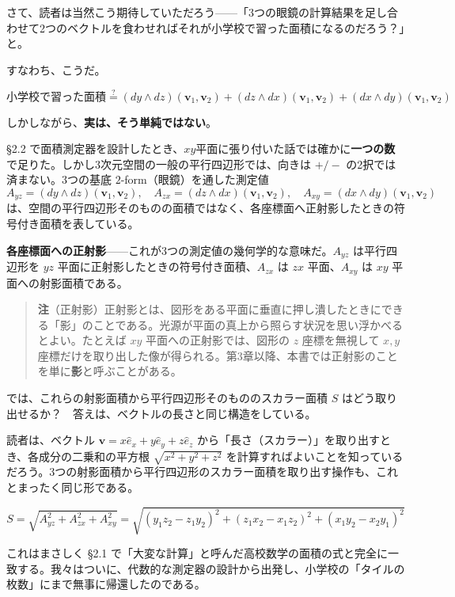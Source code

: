 \documentclass[a4paper,12pt,openany]{book}
\begin{document}
さて、読者は当然こう期待していただろう——「3つの眼鏡の計算結果を足し合わせて2つのベクトルを食わせればそれが小学校で習った面積になるのだろう？」と。

すなわち、こうだ。

\[
\text{小学校で習った面積} \stackrel{?}{=} (dy \wedge dz)(\mathbf{v}_1, \mathbf{v}_2) + (dz \wedge dx)(\mathbf{v}_1, \mathbf{v}_2) + (dx \wedge dy)(\mathbf{v}_1, \mathbf{v}_2)
\]

しかしながら、\textbf{実は、そう単純ではない}。

§2.2
で面積測定器を設計したとき、\(xy\)平面に張り付いた話では確かに\textbf{一つの数}で足りた。しかし3次元空間の一般の平行四辺形では、向きは
\(+/-\) の2択では済まない。3つの基底 \(2\)-form（眼鏡）を通した測定値
\[A_{yz} = (dy \wedge dz)(\mathbf{v}_1,\mathbf{v}_2),\quad A_{zx} = (dz \wedge dx)(\mathbf{v}_1,\mathbf{v}_2),\quad A_{xy} = (dx \wedge dy)(\mathbf{v}_1,\mathbf{v}_2)\]
は、空間の平行四辺形そのものの面積ではなく、各座標面へ正射影したときの符号付き面積を表している。

\textbf{各座標面への正射影}——これが3つの測定値の幾何学的な意味だ。\(A_{yz}\)
は平行四辺形を \(yz\) 平面に正射影したときの符号付き面積、\(A_{zx}\) は
\(zx\) 平面、\(A_{xy}\) は \(xy\) 平面への射影面積である。

\begin{quote}
\textbf{注}（正射影）正射影とは、図形をある平面に垂直に押し潰したときにできる「影」のことである。光源が平面の真上から照らす状況を思い浮かべるとよい。たとえば
\(xy\) 平面への正射影では、図形の \(z\) 座標を無視して \(x,y\)
座標だけを取り出した像が得られる。第3章以降、本書では正射影のことを単に\textbf{影}と呼ぶことがある。
\end{quote}

では、これらの射影面積から平行四辺形そのもののスカラー面積 \(S\)
はどう取り出せるか？　答えは、ベクトルの長さと同じ構造をしている。

読者は、ベクトル \(\mathbf{v} = x\hat{e}_x + y\hat{e}_y + z\hat{e}_z\)
から「長さ（スカラー）」を取り出すとき、各成分の二乗和の平方根
\(\sqrt{x^2+y^2+z^2}\)
を計算すればよいことを知っているだろう。3つの射影面積から平行四辺形のスカラー面積を取り出す操作も、これとまったく同じ形である。

\[S = \sqrt{A_{yz}^2 + A_{zx}^2 + A_{xy}^2} = \sqrt{(y_1 z_2 - z_1 y_2)^2 + (z_1 x_2 - x_1 z_2)^2 + (x_1 y_2 - x_2 y_1)^2}\]

これはまさしく §2.1
で「大変な計算」と呼んだ高校数学の面積の式と完全に一致する。我々はついに、代数的な測定器の設計から出発し、小学校の「タイルの枚数」にまで無事に帰還したのである。
\end{document}
